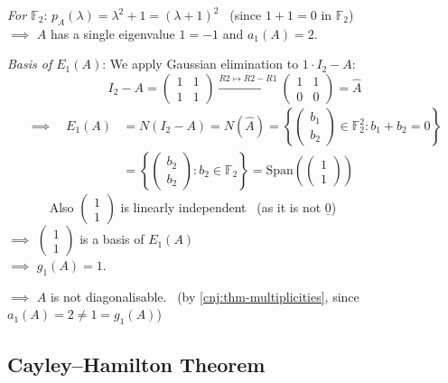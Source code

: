\documentclass[
  12pt,
  a4paper,
  twoside]{article}
\theoremstyle{plain}
\theoremstyle{definition}
\begin{document}
\emph{For \(\mathbb{F}_{2}\)}: \(p_A(\lambda) = \lambda^{2} + 1 = (\lambda + 1)^{2}\) \hfill~{(since \(1 + 1 =0\) in \(\mathbb{F}_{2}\))}\\
\(\implies\) \(A\) has a single eigenvalue \(1 = -1\) and \(a_{1}(A) =2\).

\emph{Basis of \(E_{1}(A)\)}: We apply Gaussian elimination to \(1\cdot I_2-A\):
\[
I_{2} - A = \begin{pmatrix} 1 & 1 \\ 1 & 1 \end{pmatrix}
\xrightarrow{R2 \mapsto R2 - R1}
\begin{pmatrix} 1 & 1 \\ 0 & 0 \end{pmatrix} = \widehat{A}
\]
\begin{align*}
\implies\quad E_{1}(A) &= N(I_2-A) = N(\widehat{A}) = \left\{ \begin{pmatrix} b_{1} \\ b_{2} \end{pmatrix} \in \mathbb{F}_{2}^{2} : b_{1} + b_{2} = 0 \right\}\\
&= \left\{ \begin{pmatrix} b_{2} \\ b_{2} \end{pmatrix} : b_{2} \in \mathbb{F}_{2} \right\} = \mathrm{Span} \left( \begin{pmatrix} 1 \\ 1 \end{pmatrix} \right)
\end{align*}
~~~~~~ Also \(\begin{pmatrix}1\\1\end{pmatrix}\) is linearly independent
\hfill~{(as it is not \(\underline{0}\))}\\
\(\implies\) \(\begin{pmatrix}1\\1\end{pmatrix}\) is a basis of \(E_{1}(A)\)\\
\(\implies\) \(g_1(A) = 1\).

\(\implies\) \(A\) is not diagonalisable. \hfill~{(by \ref{cnj:thm-multiplicities}, since \(a_1(A)=2\neq 1=g_1(A)\))}

\hypertarget{ss-cayley-hamilton}{%
\subsection{Cayley--Hamilton Theorem}\label{ss-cayley-hamilton}}
\end{document}
